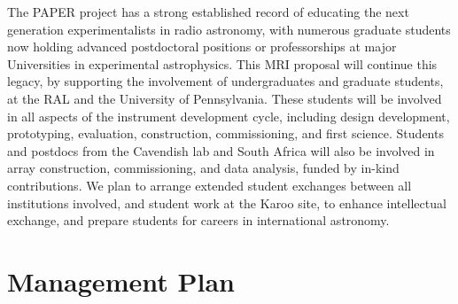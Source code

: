 \documentclass[preprint]{aastex}
\begin{document}
The PAPER project has a strong established record of educating the next generation experimentalists in radio astronomy, with numerous graduate students now holding advanced postdoctoral positions or professorships at major Universities in experimental astrophysics. This MRI proposal will continue this legacy, by supporting the involvement of undergraduates and graduate students, 
at the RAL and the University of Pennsylvania. These students will be involved  in all aspects of the instrument development cycle, including design development, prototyping, evaluation, construction, commissioning, and first science. Students and postdocs from the Cavendish lab and South Africa will also  be involved in array construction, commissioning, and data analysis, funded by in-kind contributions. We plan to arrange extended student exchanges between all institutions involved, and student work at the Karoo site, to enhance intellectual exchange, and prepare students for careers in international astronomy. 

\vspace{-0.25in}
\section{Management Plan}
\vspace{-6pt}


\end{document}

